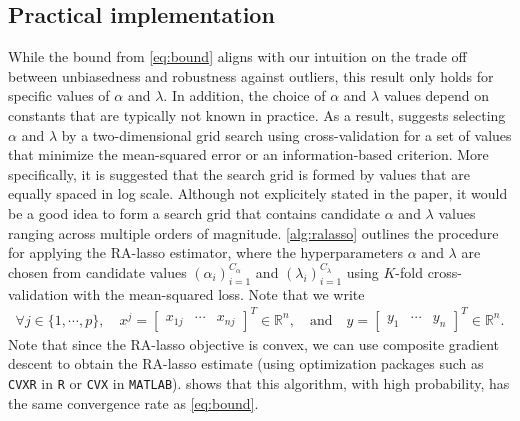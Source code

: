 \subsection{Practical implementation}
While the bound from \cref{eq:bound} aligns with our intuition on the trade off between unbiasedness and robustness against outliers, this result only holds for specific values of $\alpha$ and $\lambda$. In addition, the choice of $\alpha$ and $\lambda$ values depend on constants that are typically not known in practice. As a result, \citet{fan2017estimation} suggests selecting $\alpha$ and $\lambda$ by a two-dimensional grid search using cross-validation for a set of values that minimize the mean-squared error or an information-based criterion. More specifically, it is suggested that the search grid is formed by values that are equally spaced in log scale. Although not explicitely stated in the paper, it would be a good idea to form a search grid that contains candidate $\alpha$ and $\lambda$ values ranging across multiple orders of magnitude. \cref{alg:ralasso} outlines the procedure for applying the RA-lasso estimator, where the hyperparameters $\alpha$ and $\lambda$ are chosen from candidate values $(\alpha_i)_{i=1}^{C_\alpha}$ and $(\lambda_i)_{i=1}^{C_\lambda}$ using $K$-fold cross-validation with the mean-squared loss. Note that we write
\begin{align*}
\forall j\in\{1,\cdots,p\}, \quad x^j = \begin{bmatrix} x_{1j} & \cdots & x_{nj} \end{bmatrix}^T \in \mathbb{R}^n, \quad\text{and}\quad
y = \begin{bmatrix} y_1 & \cdots & y_n \end{bmatrix}^T \in \mathbb{R}^n.
\end{align*}
Note that since the RA-lasso objective is convex, we can use composite gradient descent to obtain the RA-lasso estimate (using optimization packages such as \texttt{CVXR} in \texttt{R} or \texttt{CVX} in \texttt{MATLAB}). \citet{fan2017estimation} shows that this algorithm, with high probability, has the same convergence rate as \cref{eq:bound}.
